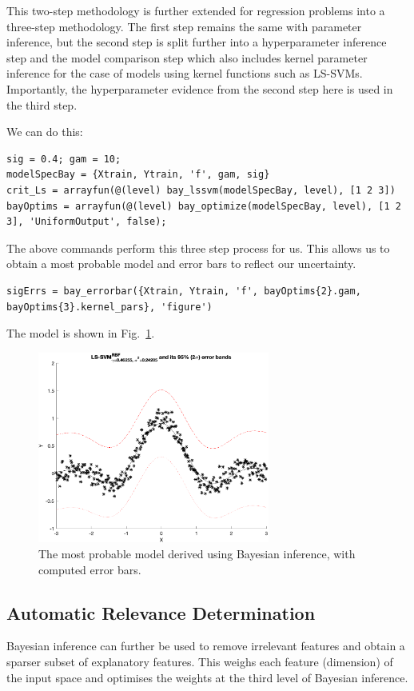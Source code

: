 \documentclass[10pt,a4paper]{article}
\begin{document}
This two-step methodology is further extended for regression problems into a three-step methodology. The first step remains the same with parameter inference, but the second step is split further into a hyperparameter inference step and the model comparison step which also includes kernel parameter inference for the case of models using kernel functions such as LS-SVMs. Importantly, the hyperparameter evidence from the second step here is used in the third step. 

We can do this:

\begin{lstlisting}[style=Matlab-editor, frame=single]
sig = 0.4; gam = 10;
modelSpecBay = {Xtrain, Ytrain, 'f', gam, sig}
crit_Ls = arrayfun(@(level) bay_lssvm(modelSpecBay, level), [1 2 3])
bayOptims = arrayfun(@(level) bay_optimize(modelSpecBay, level), [1 2 3], 'UniformOutput', false);
\end{lstlisting}

The above commands perform this three step process for us. This allows us to obtain a most probable model and error bars to reflect our uncertainty.

\begin{lstlisting}[style=Matlab-editor]
sigErrs = bay_errorbar({Xtrain, Ytrain, 'f', bayOptims{2}.gam, bayOptims{3}.kernel_pars}, 'figure')
\end{lstlisting}

The model is shown in Fig.~\ref{fig:bayesianErrorbars}.

\begin{figure}[h!]
\centering
  \includegraphics[width=3in]{bayesianErrorbars.png}
  \caption{The most probable model derived using Bayesian inference, with computed error bars.}
  \label{fig:bayesianErrorbars}
\end{figure}

\subsection{Automatic Relevance Determination}
Bayesian inference can further be used to remove irrelevant features and obtain a sparser subset of explanatory features. This weighs each feature (dimension) of the input space and optimises the weights at the third level of Bayesian inference.
\end{document}
